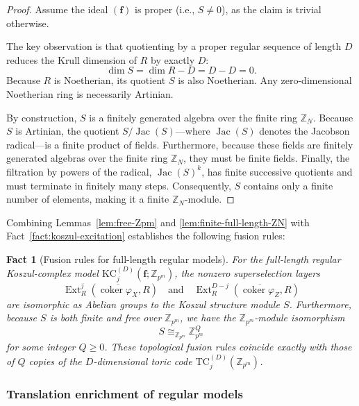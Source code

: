 \documentclass[aps,prx,english,superscriptaddress,twocolumn,tightenlines,showpacs,longbibliography,floatfix,amsfonts]{revtex4-2}
\newtheorem{fact}{Fact}
\theoremstyle{remark}
\theoremstyle{definition}
\begin{document}
\begin{proof}
	Assume the ideal $(\mathbf{f})$ is proper (i.e., $S \neq 0$), as the claim is trivial otherwise.

	The key observation is that quotienting by a proper regular sequence of length $D$ reduces the Krull dimension of $R$ by exactly $D$:
	\[
	\dim S = \dim R - D = D - D = 0.
	\]
	Because $R$ is Noetherian, its quotient $S$ is also Noetherian. Any zero-dimensional Noetherian ring is necessarily Artinian.

	By construction, $S$ is a finitely generated algebra over the finite ring $\mathbb{Z}_{N}$. Because $S$ is Artinian, the quotient $S/\operatorname{Jac}(S)$---where $\operatorname{Jac}(S)$ denotes the Jacobson radical---is a finite product of fields. Furthermore, because these fields are finitely generated algebras over the finite ring $\mathbb{Z}_N$, they must be finite fields. Finally, the filtration by powers of the radical, $\operatorname{Jac}(S)^k$, has finite successive quotients and must terminate in finitely many steps. Consequently, $S$ contains only a finite number of elements, making it a finite $\mathbb{Z}_{N}$-module.
\end{proof}

Combining Lemmas~\ref{lem:free-Zpm} and \ref{lem:finite-full-length-ZN} with Fact~\ref{fact:koszul-excitation} establishes the following fusion rules:

\begin{fact}[Fusion rules for full-length regular models]
	\label{fact:fusion-rules}
	For the full-length regular Koszul-complex model $\mathrm{KC}_j^{(D)}(\mathbf{f};\mathbb{Z}_{p^m})$, the nonzero superselection layers
	\[
	\operatorname{Ext}_R^j(\overline{\operatorname{coker}\varphi_X}, R) \quad \text{and} \quad \operatorname{Ext}_R^{D-j}(\overline{\operatorname{coker}\varphi_Z}, R)
	\]
	are isomorphic as Abelian groups to the Koszul structure module $S$. Furthermore, because $S$ is both finite and free over $\mathbb{Z}_{p^m}$, we have the $\mathbb Z_{p^m}$-module isomorphism
	\begin{equation}
		S \cong_{\mathbb Z_{p^m}} \mathbb{Z}_{p^m}^Q \label{eq:S}
	\end{equation}
	for some integer $Q \ge 0$. These topological fusion rules coincide exactly with those of $Q$ copies of the $D$-dimensional toric code $\mathrm{TC}_j^{(D)}(\mathbb{Z}_{p^m})$.
\end{fact}

\subsubsection{Translation enrichment of regular models}
\end{document}
